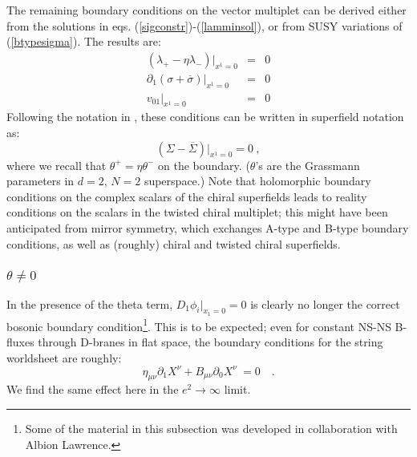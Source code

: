 \documentclass[a4paper,12pt]{article}
\begin{document}
The remaining boundary conditions on the vector
multiplet can be derived either from
the solutions in eqs. (\ref{sigconstr})-(\ref{lamminsol}),
or from SUSY variations of (\ref{btypesigma}).
The results are:
\begin{eqnarray}
(\lambda_+ -\eta \lambda_-)|_{x^1=0} &=& 0 \\
\partial_1 (\sigma +\overline{\sigma})|_{x^1=0}&=&0\\
v_{01}|_{x^1=0}&=&0
\end{eqnarray}
Following the notation in \cite{wittenphases},
these conditions can be written in superfield notation as:
\begin{equation}
(\Sigma - \overline{\Sigma})|_{x^1=0}=0\ ,
\end{equation}
where we recall that $\theta^+=\eta\theta^-$ 
on the boundary.  ($\theta$'s are
the Grassmann parameters in $d=2$, $N=2$ superspace.) 
Note that holomorphic boundary conditions on the
complex scalars of the chiral superfields leads to reality
conditions on the scalars in the twisted chiral multiplet;
this might have been
anticipated from mirror symmetry, which exchanges A-type and
B-type boundary conditions, as well as (roughly)
chiral and twisted chiral superfields.

\subsubsection{$\theta\neq 0$}

In the presence of the theta term, $D_1 \phi_i|_{x_1=0} =0$
is clearly no longer the correct bosonic boundary 
condition\footnote{Some of the material in this subsection was 
developed in collaboration with Albion Lawrence.}.  This
is to be expected; even for constant NS-NS B-fluxes
through D-branes in flat space, the boundary conditions for the
string worldsheet are roughly:
\begin{equation}
	\eta_{\mu\nu}\partial_1 X^\nu + B_{\mu\nu}
		\partial_0 X^\nu\ =0\quad.
\label{roughbfieldbc}
\end{equation}
We find the same effect here in the $e^2 \to \infty$ limit.
\end{document}
